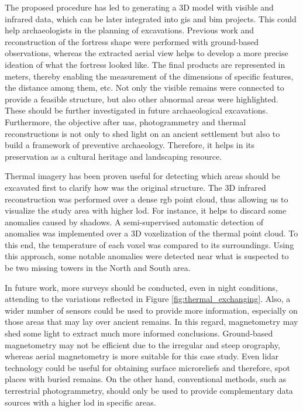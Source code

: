 The proposed procedure has led to generating a 3D model with visible and infrared data, which can be later integrated into \acrshort{gis} and \acrshort{bim} projects. This could help archaeologists in the planning of excavations. Previous work and reconstruction of the fortress shape were performed with ground-based observations, whereas the extracted aerial view helps to develop a more precise ideation of what the fortress looked like. The final products are represented in meters, thereby enabling the measurement of the dimensions of specific features, the distance among them, etc. Not only the visible remains were connected to provide a feasible structure, but also other abnormal areas were highlighted. These should be further investigated in future archaeological excavations. Furthermore, the objective after \acrshort{uas}, photogrammetry and thermal reconstructions is not only to shed light on an ancient settlement but also to build a framework of preventive archaeology. Therefore, it helps in its preservation as a cultural heritage and landscaping resource. 

Thermal imagery has been proven useful for detecting which areas should be excavated first to clarify how was the original structure. The 3D infrared reconstruction was performed over a dense \acrshort{rgb} point cloud, thus allowing us to visualize the study area with higher \acrshort{lod}. For instance, it helps to discard some anomalies caused by shadows. A semi-supervised automatic detection of anomalies was implemented over a 3D voxelization of the thermal point cloud. To this end, the temperature of each voxel was compared to its surroundings. Using this approach, some notable anomalies were detected near what is suspected to be two missing towers in the North and South area.   

In future work, more surveys should be conducted, even in night conditions, attending to the variations reflected in Figure \ref{fig:thermal_exchanging}. Also, a wider number of sensors could be used to provide more information, especially on those areas that may lay over ancient remains. In this regard, magnetometry may shed some light to extract much more informed conclusions. Ground-based magnetometry may not be efficient due to the irregular and steep orography, whereas aerial magnetometry is more suitable for this case study. Even \acrshort{lidar} technology could be useful for obtaining surface microreliefs and therefore, spot places with buried remains. On the other hand, conventional methods, such as terrestrial photogrammetry, should only be used to provide complementary data sources with a higher \acrshort{lod} in specific areas.

